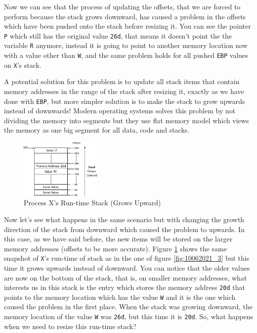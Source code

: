 Now we can see that the process of updating the offsets, that we are
forced to perform because the stack grows downward, has caused a problem
in the offsets which have been pushed onto the stack before resizing it.
You can see the pointer \lstinline!P! which still has the original value
\lstinline!26d!, that means it doesn't point the the variable
\lstinline!R! anymore, instead it is going to point to another memory
location now with a value other than \lstinline!W!, and the same problem
holds for all pushed \lstinline!EBP! values on \lstinline!X!'s stack.

A potential solution for this problem is to update all stack items that
contain memory addresses in the range of the stack after resizing it,
exactly as we have done with \lstinline!EBP!, but more simpler solution
is to make the stack to grow upwards instead of downwards! Modern
operating systems solves this problem by not dividing the memory into
segments but they use flat memory model which views the memory as one
big segment for all data, code and stacks.

\begin{figure}
\centering
\includegraphics[width=0.35000\textwidth]{Figures/x86-ch/Fig12062021_1.png}
\caption{Process X's Run-time Stack (Grows
Upward)}\label{fig:12062021_1}
\end{figure}

Now let's see what happens in the same scenario but with changing the
growth direction of the stack from downward which caused the problem to
upwards. In this case, as we have said before, the new items will be
stored on the larger memory addresses (offsets to be more accurate).
Figure \ref{fig:12062021_1} shows the same snapshot of \lstinline!X!'s
run-time of stack as in the one of figure \ref{fig:10062021_3} but this
time it grows upwards instead of downward. You can notice that the older
values are now on the bottom of the stack, that is, on smaller memory
addresses, what interests us in this stack is the entry which stores the
memory address \lstinline!20d! that points to the memory location which
has the value \lstinline!W! and it is the one which caused the problem
in the first place. When the stack was growing downward, the memory
location of the value \lstinline!W! was \lstinline!26d!, but this time
it is \lstinline!20d!. So, what happens when we need to resize this
run-time stack?

